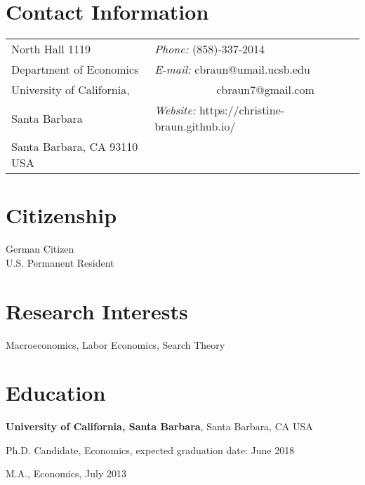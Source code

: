 \documentclass[margin,line]{res}
\newenvironment{list1}{
  \begin{list}{\ding{113}}{%
      \setlength{\itemsep}{0.05in}
      \setlength{\parsep}{0in} \setlength{\parskip}{0in}
      \setlength{\topsep}{0in} \setlength{\partopsep}{0in}
      \setlength{\leftmargin}{0.17in}}}{\end{list}}
\begin{document}

\begin{resume}
\section{\sc Contact Information}
\vspace{.05in}
\begin{tabular}{@{}p{2in}p{4in}}
North Hall 1119             & {\it Phone:}  (858)-337-2014 \\            
Department of Economics   & {\it E-mail:}  cbraun@umail.ucsb.edu \\   
University of California, & ~~~~~~~~~~~cbraun7@gmail.com \\  
Santa Barbara & {\it Website:} https://christine-braun.github.io/ \\       
Santa Barbara, CA  93110 USA
\end{tabular}

\section{\sc Citizenship}
German Citizen\\
U.S. Permanent Resident 


\section{\sc Research Interests}
Macroeconomics, Labor Economics, Search Theory

\section{\sc Education}
{\bf University of California, Santa Barbara}, Santa Barbara, CA USA\\

\vspace*{-.1in}
\begin{list1}
\item[] Ph.D. Candidate, Economics, expected graduation date: June 2018
\item[] M.A., Economics,  July 2013
\end{list1}


\end{resume}
\end{document}
